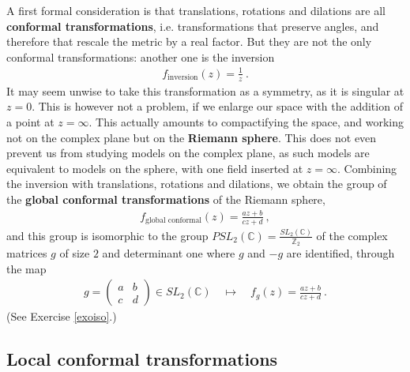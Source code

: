 \documentclass[12pt, a4paper, notitlepage, twoside]{report}
\numberwithin{equation}{section}
\theoremstyle{break}
\begin{document}
A first formal consideration is that translations, rotations and dilations are all \textbf{\boldmath conformal transformations}, i.e. transformations that preserve angles, and therefore that rescale the metric by a real factor.
But they are not the only conformal transformations: another one is the inversion
\begin{align}
 f_\text{inversion}(z) = \frac{1}{z}\ .
\end{align}
It may seem unwise to take this transformation as a symmetry, as it is singular at $z=0$.
This is however not a problem, if we enlarge our space with the addition of a point at $z=\infty$.
This actually amounts to compactifying the space, and working not on the complex plane but on the \textbf{\boldmath Riemann sphere}.
This does not even prevent us from studying models on the complex plane, as such models are equivalent to models on the sphere, with one field inserted at $z=\infty$.
Combining the inversion with translations, rotations and dilations, we obtain the group of the \textbf{\boldmath global conformal transformations} of the Riemann sphere,
\begin{align}
 \boxed{f_\text{global conformal}(z)  = \frac{az+b}{cz+d}}\ ,
\end{align}
and this group is isomorphic to the group $PSL_2({\mathbb{C}})=\frac{SL_2({\mathbb{C}})}{{\mathbb{Z}}_2}$ of the complex matrices $g$ of size $2$ and determinant one where $g$ and $-g$ are identified, through the map
\begin{align}
 g = \left(\begin{array}{cc} a & b \\ c & d \end{array}\right) \in SL_2({\mathbb{C}}) \quad \longmapsto\quad f_g(z) = \frac{az+b}{cz+d}\ .
\label{gisl}
\end{align}
(See Exercise \ref{exoiso}.) 


\subsection{Local conformal transformations \label{secloc}}
\end{document}
